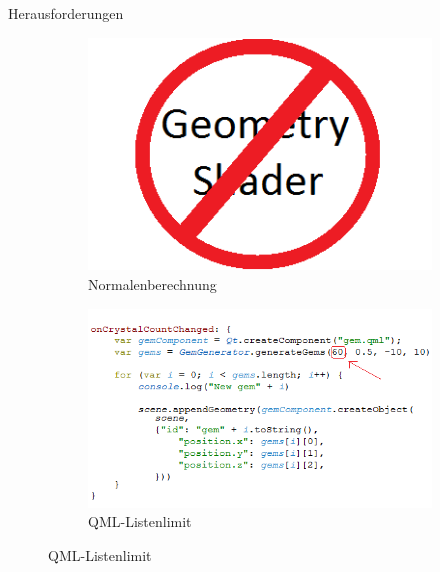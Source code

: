 \slideonetoone
{Herausforderungen}
{	
	\begin{figure}
		\centering
		\begin{subfigure}{\textwidth}
			\centering
			\includegraphics[width=\textwidth, height=0.3\textheight, keepaspectratio]{images/nogeometry}
			\caption{Normalenberechnung}
		\end{subfigure}
		\begin{subfigure}{\textwidth}
			\centering
			\includegraphics[width=\textwidth, height=0.3\textheight, keepaspectratio]{images/60max}
			\caption{QML-Listenlimit}
		\end{subfigure}
	\end{figure}
}
